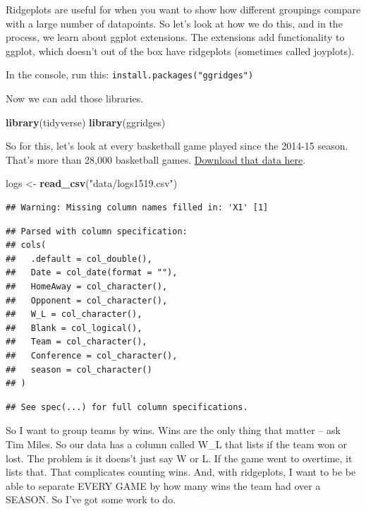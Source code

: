 \documentclass[]{book}
\newenvironment{Shaded}{\begin{snugshade}}{\end{snugshade}}
\newcommand{\KeywordTok}[1]{\textcolor[rgb]{0.13,0.29,0.53}{\textbf{#1}}}
\newcommand{\StringTok}[1]{\textcolor[rgb]{0.31,0.60,0.02}{#1}}
\newcommand{\NormalTok}[1]{#1}
\begin{document}
Ridgeplots are useful for when you want to show how different groupings
compare with a large number of datapoints. So let's look at how we do
this, and in the process, we learn about ggplot extensions. The
extensions add functionality to ggplot, which doesn't out of the box
have ridgeplots (sometimes called joyplots).

In the console, run this: \texttt{install.packages("ggridges")}

Now we can add those libraries.

\begin{Shaded}
\begin{Highlighting}[]
\KeywordTok{library}\NormalTok{(tidyverse)}
\KeywordTok{library}\NormalTok{(ggridges)}
\end{Highlighting}
\end{Shaded}

So for this, let's look at every basketball game played since the
2014-15 season. That's more than 28,000 basketball games.
\href{https://unl.box.com/s/u9407jj007fxtnu1vbkybdawaqg6j3fw}{Download
that data here}.

\begin{Shaded}
\begin{Highlighting}[]
\NormalTok{logs <-}\StringTok{ }\KeywordTok{read_csv}\NormalTok{(}\StringTok{"data/logs1519.csv"}\NormalTok{)}
\end{Highlighting}
\end{Shaded}

\begin{verbatim}
## Warning: Missing column names filled in: 'X1' [1]
\end{verbatim}

\begin{verbatim}
## Parsed with column specification:
## cols(
##   .default = col_double(),
##   Date = col_date(format = ""),
##   HomeAway = col_character(),
##   Opponent = col_character(),
##   W_L = col_character(),
##   Blank = col_logical(),
##   Team = col_character(),
##   Conference = col_character(),
##   season = col_character()
## )
\end{verbatim}

\begin{verbatim}
## See spec(...) for full column specifications.
\end{verbatim}

So I want to group teams by wins. Wins are the only thing that matter --
ask Tim Miles. So our data has a column called W\_L that lists if the
team won or lost. The problem is it doens't just say W or L. If the game
went to overtime, it lists that. That complicates counting wins. And,
with ridgeplots, I want to be be able to separate EVERY GAME by how many
wins the team had over a SEASON. So I've got some work to do.
\end{document}

